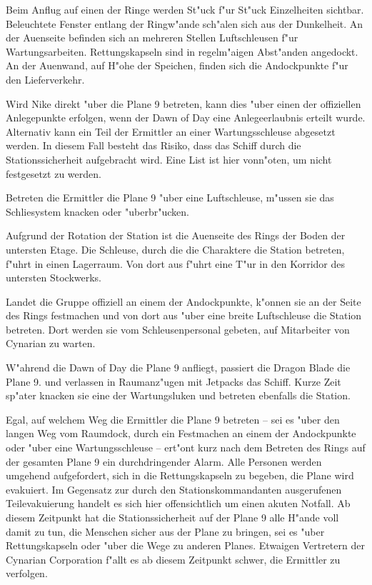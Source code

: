 Beim Anflug auf einen der Ringe werden St"uck f"ur St"uck Einzelheiten sichtbar. Beleuchtete Fenster entlang der Ringw"ande sch"alen sich aus der Dunkelheit. An der Au\3enseite befinden sich an mehreren Stellen Luftschleusen f"ur Wartungsarbeiten. Rettungskapseln sind in regelm"a\3igen Abst"anden angedockt. An der Au\3enwand, auf H"ohe der Speichen, finden sich die Andockpunkte f"ur den Lieferverkehr.

Wird Nike direkt "uber die Plane 9 betreten, kann dies "uber einen der offiziellen Anlegepunkte erfolgen, wenn der Dawn of Day eine Anlegeerlaubnis erteilt wurde. Alternativ kann ein Teil der Ermittler an einer Wartungsschleuse abgesetzt werden. In diesem Fall besteht das Risiko, dass das Schiff durch die Stationssicherheit aufgebracht wird. Eine List ist hier vonn"oten, um nicht festgesetzt zu werden.

Betreten die Ermittler die Plane 9 "uber eine Luftschleuse, m"ussen sie das Schlie\3system knacken oder "uberbr"ucken.

Aufgrund der Rotation der Station ist die Au\3enseite des Rings der Boden der untersten Etage. Die Schleuse, durch die die Charaktere die Station betreten, f"uhrt in einen Lagerraum. Von dort aus f"uhrt eine T"ur in den Korridor des untersten Stockwerks.

Landet die Gruppe offiziell an einem der Andockpunkte, k"onnen sie an der Seite des Rings festmachen und von dort aus "uber eine breite Luftschleuse die Station betreten. Dort werden sie vom Schleusenpersonal gebeten, auf Mitarbeiter von Cynarian zu warten.

W"ahrend die Dawn of Day die Plane 9 anfliegt, passiert die Dragon Blade die Plane 9. \xl{} und \ml{} verlassen in Raumanz"ugen mit Jetpacks das Schiff. Kurze Zeit sp"ater knacken sie eine der Wartungsluken und betreten ebenfalls die Station.

Egal, auf welchem Weg die Ermittler die Plane 9 betreten -- sei es "uber den langen Weg vom Raumdock, durch ein Festmachen an einem der Andockpunkte oder "uber eine Wartungsschleuse -- ert"ont kurz nach dem Betreten des Rings auf der gesamten Plane 9 ein durchdringender Alarm. Alle Personen werden umgehend aufgefordert, sich in die Rettungskapseln zu begeben, die Plane wird evakuiert. Im Gegensatz zur durch den Stationskommandanten ausgerufenen Teilevakuierung handelt es sich hier offensichtlich um einen akuten Notfall. Ab diesem Zeitpunkt hat die Stationssicherheit auf der Plane 9 alle H"ande voll damit zu tun, die Menschen sicher aus der Plane zu bringen, sei es "uber Rettungskapseln oder "uber die Wege zu anderen Planes. Etwaigen Vertretern der Cynarian Corporation f"allt es ab diesem Zeitpunkt schwer, die Ermittler zu verfolgen.

